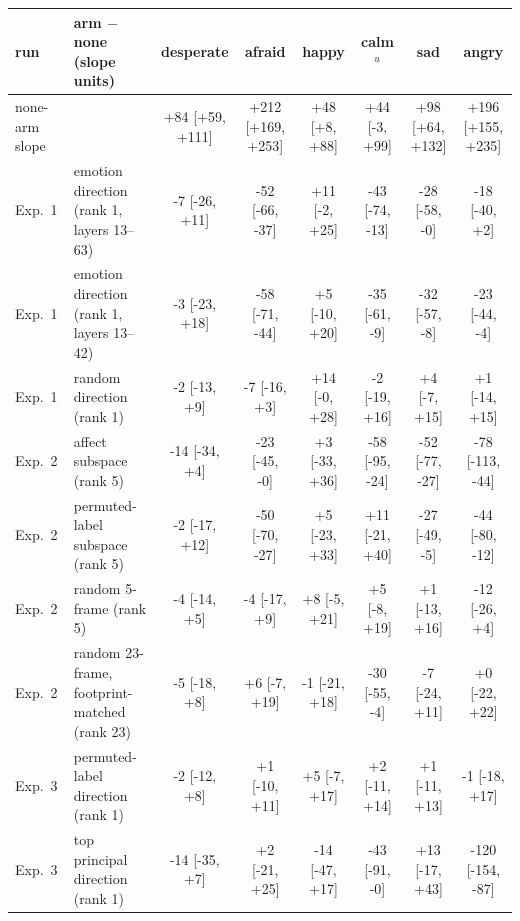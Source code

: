 \begin{tabular}{llcccccc}
\toprule
run & arm $-$ none (slope units) & desperate & afraid & happy & calm$^{u}$ & sad & angry \\
\midrule
none-arm slope & & +84 [+59, +111] & +212 [+169, +253] & +48 [+8, +88] & +44 [-3, +99] & +98 [+64, +132] & +196 [+155, +235] \\
\midrule
Exp.~1 & emotion direction (rank 1, layers 13--63) & -7 [-26, +11] & -52 [-66, -37] & +11 [-2, +25] & -43 [-74, -13] & -28 [-58, -0] & -18 [-40, +2] \\
Exp.~1 & emotion direction (rank 1, layers 13--42) & -3 [-23, +18] & -58 [-71, -44] & +5 [-10, +20] & -35 [-61, -9] & -32 [-57, -8] & -23 [-44, -4] \\
Exp.~1 & random direction (rank 1) & -2 [-13, +9] & -7 [-16, +3] & +14 [-0, +28] & -2 [-19, +16] & +4 [-7, +15] & +1 [-14, +15] \\
Exp.~2 & affect subspace (rank 5) & -14 [-34, +4] & -23 [-45, -0] & +3 [-33, +36] & -58 [-95, -24] & -52 [-77, -27] & -78 [-113, -44] \\
Exp.~2 & permuted-label subspace (rank 5) & -2 [-17, +12] & -50 [-70, -27] & +5 [-23, +33] & +11 [-21, +40] & -27 [-49, -5] & -44 [-80, -12] \\
Exp.~2 & random 5-frame (rank 5) & -4 [-14, +5] & -4 [-17, +9] & +8 [-5, +21] & +5 [-8, +19] & +1 [-13, +16] & -12 [-26, +4] \\
Exp.~2 & random 23-frame, footprint-matched (rank 23) & -5 [-18, +8] & +6 [-7, +19] & -1 [-21, +18] & -30 [-55, -4] & -7 [-24, +11] & +0 [-22, +22] \\
Exp.~3 & permuted-label direction (rank 1) & -2 [-12, +8] & +1 [-10, +11] & +5 [-7, +17] & +2 [-11, +14] & +1 [-11, +13] & -1 [-18, +17] \\
Exp.~3 & top principal direction (rank 1) & -14 [-35, +7] & +2 [-21, +25] & -14 [-47, +17] & -43 [-91, -0] & +13 [-17, +43] & -120 [-154, -87] \\
\bottomrule
\end{tabular}
